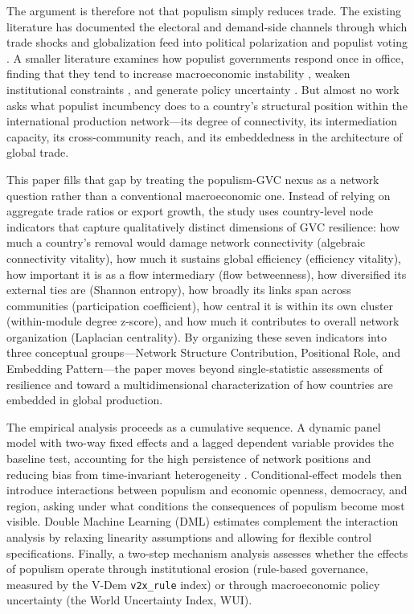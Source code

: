 \documentclass[12pt]{article}
\begin{document}
The argument is therefore not that populism simply reduces trade. The existing literature has documented the electoral and demand-side channels through which trade shocks and globalization feed into political polarization and populist voting \citep{autor2020, colantone2018apsr, colantone2018ajps, rogowski1987, margalit2011}. A smaller literature examines how populist governments respond once in office, finding that they tend to increase macroeconomic instability \citep{dornbusch1991, funke2020}, weaken institutional constraints \citep{funke2016, bermeo2016, levitskyloxton2013}, and generate policy uncertainty \citep{baker2016, bloom2009}. But almost no work asks what populist incumbency does to a country's structural position within the international production network---its degree of connectivity, its intermediation capacity, its cross-community reach, and its embeddedness in the architecture of global trade.

This paper fills that gap by treating the populism-GVC nexus as a network question rather than a conventional macroeconomic one. Instead of relying on aggregate trade ratios or export growth, the study uses country-level node indicators that capture qualitatively distinct dimensions of GVC resilience: how much a country's removal would damage network connectivity (algebraic connectivity vitality), how much it sustains global efficiency (efficiency vitality), how important it is as a flow intermediary (flow betweenness), how diversified its external ties are (Shannon entropy), how broadly its links span across communities (participation coefficient), how central it is within its own cluster (within-module degree z-score), and how much it contributes to overall network organization (Laplacian centrality). By organizing these seven indicators into three conceptual groups---Network Structure Contribution, Positional Role, and Embedding Pattern---the paper moves beyond single-statistic assessments of resilience and toward a multidimensional characterization of how countries are embedded in global production.

The empirical analysis proceeds as a cumulative sequence. A dynamic panel model with two-way fixed effects and a lagged dependent variable provides the baseline test, accounting for the high persistence of network positions and reducing bias from time-invariant heterogeneity \citep{nickell1981, arellano1991}. Conditional-effect models then introduce interactions between populism and economic openness, democracy, and region, asking under what conditions the consequences of populism become most visible. Double Machine Learning (DML) estimates \citep{chernozhukov2018, belloni2014} complement the interaction analysis by relaxing linearity assumptions and allowing for flexible control specifications. Finally, a two-step mechanism analysis assesses whether the effects of populism operate through institutional erosion (rule-based governance, measured by the V-Dem \texttt{v2x\_rule} index) or through macroeconomic policy uncertainty (the World Uncertainty Index, WUI).
\end{document}
